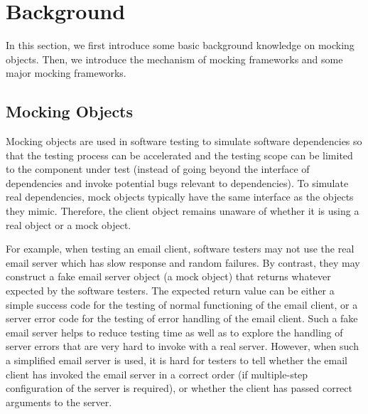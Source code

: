 \section{Background}
\label{sec:background}
In this section, we first introduce some basic background knowledge on mocking objects. Then, we introduce the mechanism of mocking frameworks and some major mocking frameworks.
\subsection{Mocking Objects}

Mocking objects are used in software testing to simulate software dependencies so that the testing process can be accelerated and the testing scope can be limited to the component under test (instead of going beyond the interface of dependencies and invoke potential bugs relevant to dependencies). To simulate real dependencies, mock objects typically have the same interface as the objects they mimic. Therefore, the client object remains unaware of whether it is using a real object or a mock object. 


For example, when testing an email client, software testers may not use the real email server which has slow response and random failures. By contrast, they may construct a fake email server object (a mock object) that returns whatever expected by the software testers. The expected return value can be either a simple success code for the testing of normal functioning of the email client, or a server error code for the testing of error handling of the email client. Such a fake email server helps to reduce testing time as well as to explore the handling of server errors that are very hard to invoke with a real server. However, when such a simplified email server is used, it is hard for testers to tell whether the email client has invoked the email server in a correct order (if multiple-step configuration of the server is required), or whether the client has passed correct arguments to the server. 

